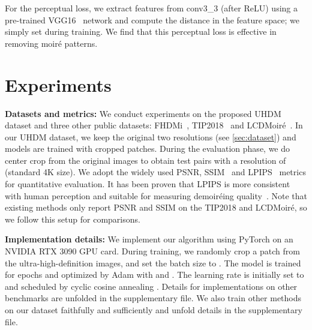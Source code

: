 \documentclass[runningheads]{llncs}
\begin{document}
For the perceptual loss, we extract features from conv3\_3 (after ReLU) using a pre-trained VGG16~\cite{simonyan2014very} network and compute the  distance in the feature space; we simply set  during training. We find that this perceptual loss is effective in removing moiré patterns. 

\section{Experiments}
\label{sec:ex}

\noindent\textbf{Datasets and metrics:}
We conduct experiments on the proposed UHDM dataset and three other public datasets: FHDMi~\cite{he2020fhde}, TIP2018~\cite{sun2018moire} and LCDMoiré~\cite{yuan2019aim}. 
In our UHDM dataset, we keep the original two resolutions (see \cref{sec:dataset}) and models are trained with cropped patches. During the evaluation phase, we do center crop from the original images to obtain test pairs with a resolution of  (standard 4K size).
We adopt the widely used PSNR, SSIM~\cite{wang2004image} and LPIPS~\cite{zhang2018unreasonable} metrics for quantitative evaluation. It has been proven that LPIPS is more consistent with human perception and suitable for measuring demoiréing quality~\cite{he2020fhde}. 
Note that existing methods only report PSNR and SSIM on the TIP2018 and LCDMoiré, so we follow this setup for comparisons. 

\noindent\textbf{Implementation details:}
We implement our algorithm using PyTorch on an NVIDIA RTX 3090 GPU card. During training, we randomly crop a  patch from the ultra-high-definition images, and set the batch size to . The model is trained for  epochs and optimized by Adam \cite{kingma2014adam} with  and . The learning rate is initially set to  and scheduled by cyclic cosine annealing \cite{loshchilov2016sgdr}. Details for implementations on other benchmarks are unfolded in the supplementary file. We also train other methods on our dataset faithfully and sufficiently and unfold details in the supplementary file.
\end{document}
